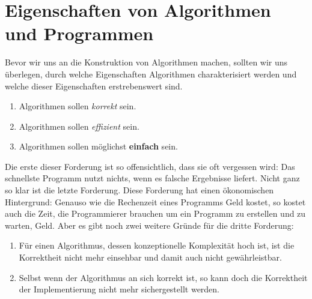 \section{Eigenschaften von Algorithmen und Programmen}
Bevor wir uns an die Konstruktion von Algorithmen machen, sollten wir uns
\"uberlegen, durch welche Eigenschaften Algorithmen charakterisiert werden und
welche dieser Eigenschaften erstrebenswert sind.
\begin{enumerate}
\item Algorithmen sollen \emph{korrekt} sein.
\item Algorithmen sollen \emph{effizient} sein.
\item Algorithmen sollen m\"oglichst \textbf{einfach} sein.
\end{enumerate}
Die erste dieser Forderung ist so offensichtlich, dass sie oft vergessen wird:
 Das schnellste Programm nutzt nichts, wenn es falsche Ergebnisse liefert. 
Nicht ganz so klar ist die letzte Forderung.  Diese Forderung hat einen
\"okonomischen Hintergrund: Genauso wie die Rechenzeit eines Programms Geld
kostet, so kostet auch die Zeit, die Programmierer brauchen um ein Programm zu
erstellen und zu warten, Geld.  Aber es gibt noch zwei weitere Gr\"unde f\"ur die
dritte Forderung:
\begin{enumerate}
\item F\"ur einen Algorithmus, dessen konzeptionelle Komplexit\"at hoch ist, ist die
      Korrektheit nicht mehr einsehbar und damit auch nicht gew\"ahrleistbar. 
\item Selbst wenn der Algorithmus an sich korrekt ist, so kann doch die
      Korrektheit der Implementierung nicht mehr sichergestellt werden.
\end{enumerate}

